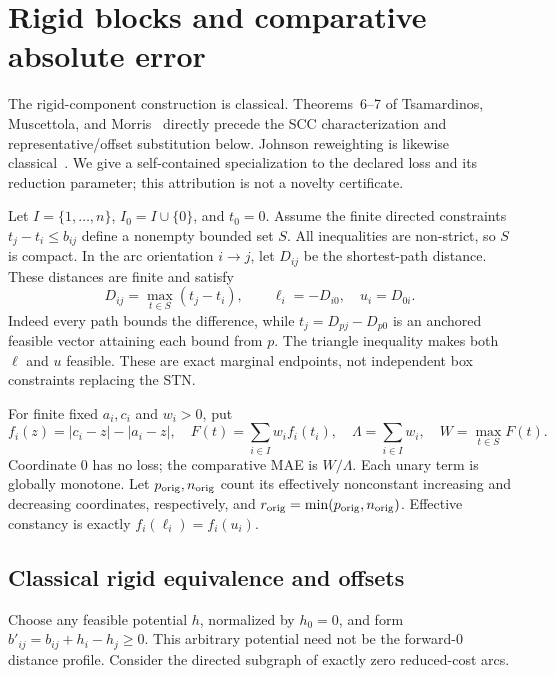 \section{Rigid blocks and comparative absolute error}
\label{sec:rigid-theory}

The rigid-component construction is classical. Theorems~6--7 of
Tsamardinos, Muscettola, and Morris~\cite{tsamardinos1998} directly precede
the SCC characterization and representative/offset substitution below.
Johnson reweighting is likewise classical~\cite{johnson1977}.
We give a self-contained specialization to the declared loss and its
reduction parameter; this attribution is not a novelty certificate.

Let \(I=\{1,\ldots,n\}\), \(I_0=I\cup\{0\}\), and \(t_0=0\).
Assume the finite directed constraints \(t_j-t_i\le b_{ij}\) define a
nonempty bounded set \(S\). All inequalities are non-strict, so \(S\) is
compact. In the arc orientation \(i\to j\), let \(D_{ij}\) be the
shortest-path distance. These distances are finite and satisfy
\[
 D_{ij}=\max_{t\in S}(t_j-t_i),\qquad
 \ell_i=-D_{i0},\quad u_i=D_{0i}.
\]
Indeed every path bounds the difference, while
\(t_j=D_{pj}-D_{p0}\) is an anchored feasible vector attaining each
bound from \(p\). The triangle inequality makes both \(\ell\) and \(u\)
feasible. These are exact marginal endpoints, not independent box
constraints replacing the STN.

For finite fixed \(a_i,c_i\) and \(w_i>0\), put
\[
 f_i(z)=|c_i-z|-|a_i-z|,\quad
 F(t)=\sum_{i\in I}w_i f_i(t_i),\quad
 \Lambda=\sum_{i\in I}w_i,\quad
 W=\max_{t\in S}F(t).
\]
Coordinate 0 has no loss; the comparative MAE is \(W/\Lambda\).
Each unary term is globally monotone. Let \(p_{\rm orig},n_{\rm orig}\)
count its effectively nonconstant increasing and decreasing coordinates,
respectively, and \(r_{\rm orig}=\min(p_{\rm orig},n_{\rm orig})\).
Effective constancy is exactly \(f_i(\ell_i)=f_i(u_i)\).

\subsection{Classical rigid equivalence and offsets}

Choose any feasible potential \(h\), normalized by \(h_0=0\), and form
\(b'_{ij}=b_{ij}+h_i-h_j\ge0\). This arbitrary potential need not be the
forward-0 distance profile. Consider the directed subgraph of exactly
zero reduced-cost arcs.

